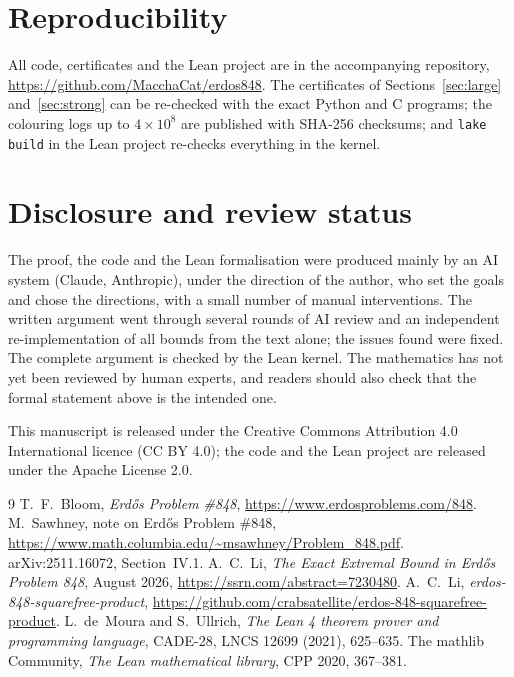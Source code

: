 \documentclass[11pt]{amsart}
\theoremstyle{definition}
\theoremstyle{remark}
\newcommand{\lean}[1]{\texttt{#1}}
\begin{document}
\section{Reproducibility}
All code, certificates and the Lean project are in the accompanying repository,
\url{https://github.com/MacchaCat/erdos848}.
The certificates of Sections~\ref{sec:large} and~\ref{sec:strong} can be re-checked
with the exact Python and C programs; the colouring logs up to $4\times10^8$ are
published with SHA-256 checksums; and \lean{lake build} in the Lean project
re-checks everything in the kernel.

\section*{Disclosure and review status}
The proof, the code and the Lean formalisation were produced mainly by an AI
system (Claude, Anthropic), under the direction of the author, who set the goals and
chose the directions, with a small number of manual interventions. The written
argument went through several rounds of AI review and an independent
re-implementation of all bounds from the text alone; the issues found were fixed.
The complete argument is checked by the Lean kernel. The mathematics has not yet
been reviewed by human experts, and readers should also check that the formal
statement above is the intended one.

This manuscript is released under the Creative Commons Attribution 4.0
International licence (CC BY 4.0); the code and the Lean project are released
under the Apache License 2.0.

\begin{thebibliography}{9}
 T.~F.~Bloom, \emph{Erd\H{o}s Problem \#848},
  \url{https://www.erdosproblems.com/848}.
 M.~Sawhney, note on Erd\H{o}s Problem \#848,
  \url{https://www.math.columbia.edu/~msawhney/Problem_848.pdf}.
 arXiv:2511.16072, Section~IV.1.
 A.~C.~Li, \emph{The Exact Extremal Bound in Erd\H{o}s Problem 848},
  August 2026, \url{https://ssrn.com/abstract=7230480}.
 A.~C.~Li, \emph{erdos-848-squarefree-product},
  \url{https://github.com/crabsatellite/erdos-848-squarefree-product}.
 L.~de~Moura and S.~Ullrich, \emph{The Lean 4 theorem prover and
  programming language}, CADE-28, LNCS 12699 (2021), 625--635.
 The mathlib Community, \emph{The Lean mathematical library},
  CPP 2020, 367--381.
\end{thebibliography}
\end{document}
